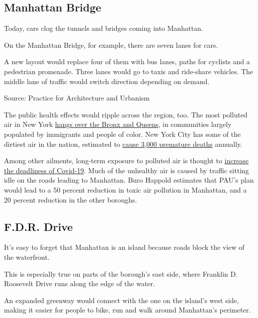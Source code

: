 \hypertarget{manhattan-bridge}{%
\subsection{Manhattan Bridge}\label{manhattan-bridge}}

Today, cars clog the tunnels and bridges coming into Manhattan.

On the Manhattan Bridge, for example, there are seven lanes for cars.

A new layout would replace four of them with bus lanes, paths for
cyclists and a pedestrian promenade. Three lanes would go to taxis and
ride-share vehicles. The middle lane of traffic would switch direction
depending on demand.

Source: Practice for Architecture and Urbanism

The public health effects would ripple across the region, too. The most
polluted air in New York
\href{https://www.ucsusa.org/sites/default/files/attach/2019/06/Inequitable-Exposure-to-Vehicle-Pollution-NY.pdf}{hangs
over the Bronx and Queens}, in communities largely populated by
immigrants and people of color. New York City has some of the dirtiest
air in the nation, estimated to
\href{https://www1.nyc.gov/assets/doh/downloads/pdf/eode/eode-air-quality-impact.pdf}{cause
3,000 premature deaths} annually.

Among other ailments, long-term exposure to polluted air is thought to
\href{https://www.nytimes.com/2020/04/07/climate/air-pollution-coronavirus-covid.html}{increase
the deadliness of Covid-19}. Much of the unhealthy air is caused by
traffic sitting idle on the roads leading to Manhattan. Buro Happold
estimates that PAU's plan would lead to a 50 percent reduction in toxic
air pollution in Manhattan, and a 20 percent reduction in the other
boroughs.

\hypertarget{fdr-drive}{%
\subsection{F.D.R. Drive}\label{fdr-drive}}

It's easy to forget that Manhattan is an island because roads block the
view of the waterfront.

This is especially true on parts of the borough's east side, where
Franklin D. Roosevelt Drive runs along the edge of the water.

An expanded greenway would connect with the one on the island's west
side, making it easier for people to bike, run and walk around
Manhattan's perimeter.

